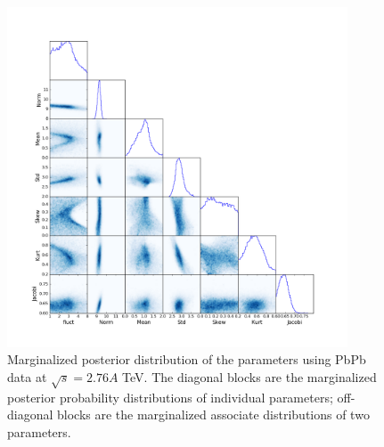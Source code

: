 \documentclass[aps,prl,twocolumn,groupedaddress]{revtex4-1}
\begin{document}
	\begin{figure}
	\begin{center}
	\includegraphics[width=0.9\textwidth]{pics/corner-PbPb.png}
	\caption{Marginalized posterior distribution of the parameters using PbPb data at $\sqrt{s} = 2.76 A$ TeV. The diagonal blocks are the marginalized posterior probability distributions of individual parameters; off-diagonal blocks are the marginalized associate distributions of two parameters.}\label{corner-PbPb}
	\end{center}
	\end{figure}
	
\end{document}
